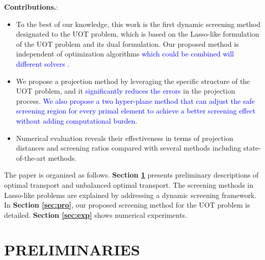\documentclass[twoside]{article}
\theoremstyle{plain}
\newcommand{\changeXS}[1]{\textcolor{blue}{#1}}
\begin{document}
\textbf{Contributions.}: 
\begin{itemize}
\item To the best of our knowledge, this work is the first dynamic screening method designated to the UOT problem, which is based on the Lasso-like formulation of the UOT problem and its dual formulation. Our proposed method is independent of optimization algorithms \changeXS{which could be combined will different solvers }.
\item We propose a projection method by leveraging the specific structure of the UOT problem, and it \changeXS{significantly reduces the errors} in the projection process.
\changeXS{We also propose a two hyper-plane method that can adjust the safe screening region for every primal element to achieve a better screening effect without adding computational burden}.
\item Numerical evaluation reveals their effectiveness in terms of projection distances and screening ratios compared with several methods including state-of-the-art methods.
\end{itemize}


The paper is organized as follows. {\bf Section \ref{sec:pre}} presents preliminary descriptions of optimal transport and unbalanced optimal transport. The screening methods in Lasso-like problems are explained by addressing a dynamic screening framework. In {\bf Section \ref{sec:pro}}, our proposed screening method for the UOT problem is detailed. {\bf Section \ref{sec:exp}} shows numerical experiments.

\section{PRELIMINARIES}
\label{sec:pre}
\end{document}
